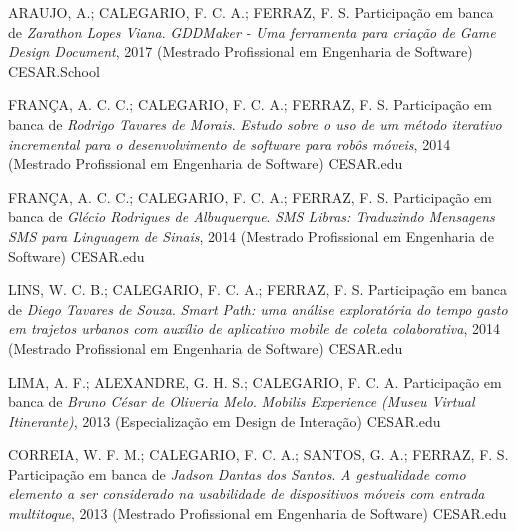 \begin{cvparagraph}
ARAUJO, A.; CALEGARIO, F. C. A.; FERRAZ, F. S. Participação em banca de \textit{Zarathon Lopes Viana}. \textit{GDDMaker - Uma ferramenta para criação de Game Design Document}, 2017 (Mestrado Profissional em Engenharia de Software) CESAR.School
\end{cvparagraph}
\begin{cvparagraph}
FRANÇA, A. C. C.; CALEGARIO, F. C. A.; FERRAZ, F. S. Participação em banca de \textit{Rodrigo Tavares de Morais}. \textit{Estudo sobre o uso de um método iterativo incremental para o desenvolvimento de software para robôs móveis}, 2014 (Mestrado Profissional em Engenharia de Software) CESAR.edu
\end{cvparagraph}
\begin{cvparagraph}
FRANÇA, A. C. C.; CALEGARIO, F. C. A.; FERRAZ, F. S. Participação em banca de \textit{Glécio Rodrigues de Albuquerque}. \textit{SMS Libras: Traduzindo Mensagens SMS para Linguagem de Sinais}, 2014 (Mestrado Profissional em Engenharia de Software) CESAR.edu
\end{cvparagraph}
\begin{cvparagraph}
LINS, W. C. B.; CALEGARIO, F. C. A.; FERRAZ, F. S. Participação em banca de \textit{Diego Tavares de Souza}. \textit{Smart Path: uma análise exploratória do tempo gasto em trajetos urbanos com auxílio de aplicativo mobile de coleta colaborativa}, 2014 (Mestrado Profissional em Engenharia de Software) CESAR.edu 
\end{cvparagraph}
\begin{cvparagraph}
LIMA, A. F.; ALEXANDRE, G. H. S.; CALEGARIO, F. C. A. Participação em banca de \textit{Bruno César de Oliveria Melo}. \textit{Mobilis Experience (Museu Virtual Itinerante)}, 2013 (Especialização em Design de Interação) CESAR.edu
\end{cvparagraph}
\begin{cvparagraph}
CORREIA, W. F. M.; CALEGARIO, F. C. A.; SANTOS, G. A.; FERRAZ, F. S. Participação em banca de \textit{Jadson Dantas dos Santos}. \textit{A gestualidade como elemento a ser considerado na usabilidade de dispositivos móveis com entrada multitoque}, 2013 (Mestrado Profissional em Engenharia de Software) CESAR.edu
\\
\end{cvparagraph}
